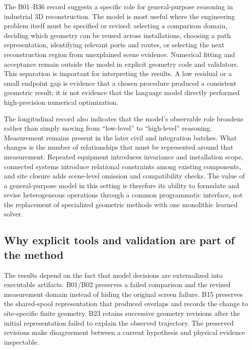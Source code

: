 \documentclass[10pt,a4paper]{article}
\begin{document}
The B01--B36 record suggests a specific role for general-purpose
reasoning in industrial 3D reconstruction. The model is most useful
where the engineering problem itself must be specified or revised:
selecting a comparison domain, deciding which geometry can be reused
across installations, choosing a path representation, identifying
relevant ports and routes, or selecting the next reconstruction region
from unexplained scene evidence. Numerical fitting and acceptance remain
outside the model in explicit geometry code and validators. This
separation is important for interpreting the results. A low residual or
a small endpoint gap is evidence that a chosen procedure produced a
consistent geometric result; it is not evidence that the language model
directly performed high-precision numerical optimization.

The longitudinal record also indicates that the model's observable role
broadens rather than simply moving from ``low-level'' to ``high-level''
reasoning. Measurement remains present in the later civil and
integration batches. What changes is the number of relationships that
must be represented around that measurement. Repeated equipment
introduces invariance and installation scope, connected systems
introduce relational constraints among existing components, and site
closure adds scene-level omission and compatibility checks. The value of
a general-purpose model in this setting is therefore its ability to
formulate and revise heterogeneous operations through a common
programmatic interface, not the replacement of specialized geometric
methods with one monolithic learned solver.

\hypertarget{why-explicit-tools-and-validation-are-part-of-the-method}{%
\subsection{Why explicit tools and validation are part of the
method}\label{why-explicit-tools-and-validation-are-part-of-the-method}}

The results depend on the fact that model decisions are externalized
into executable artifacts. B01/B02 preserves a failed comparison and the
revised measurement domain instead of hiding the original screen
failure. B15 preserves the shared-spool representation that produced
overlaps and records the change to site-specific finite geometry. B23
retains successive geometry revisions after the initial representation
failed to explain the observed trajectory. The preserved revisions make
disagreement between a current hypothesis and physical evidence
inspectable.
\end{document}
